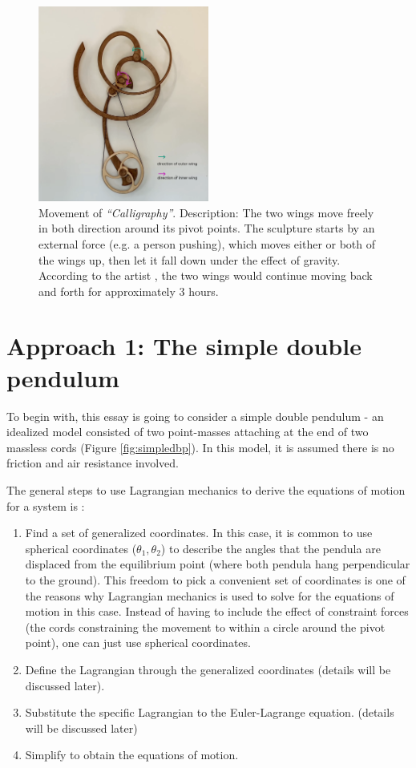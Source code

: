\documentclass[a4paper,12pt]{article}
\begin{document}
    \begin{figure}[H]
        \centering
        \includegraphics[width=0.5\textwidth]{movement} 
        \caption{Movement of \textit{“Calligraphy”}. Description: The two wings move freely in both direction around its pivot points. The sculpture starts by an external force (e.g. a person pushing), which moves either or both of the wings up, then let it fall down under the effect of gravity. According to the artist \cite{roy-2021}, the two wings would continue moving back and forth for approximately 3 hours.}
        \label{fig:movement}
    \end{figure}

\section{Approach 1: The simple double pendulum}
To begin with, this essay is going to consider a simple double pendulum - an idealized model consisted of two point-masses attaching at the end of two massless cords (Figure \ref{fig:simpledbp}). In this model, it is assumed there is no friction and air resistance involved.

The general steps to use Lagrangian mechanics to derive the equations of motion for a system is \cite{hirvonen-2022}:
\begin{enumerate}
    \item Find a set of generalized coordinates.
    In this case, it is common to use spherical coordinates ($\theta_1, \theta_2$) to describe the angles that the pendula are displaced from the equilibrium point (where both pendula hang perpendicular to the ground).
    This freedom to pick a convenient set of coordinates is one of the reasons why Lagrangian mechanics is used to solve for the equations of motion in this case. Instead of having to include the effect of constraint forces (the cords constraining the movement to within a circle around the pivot point), one can just use spherical coordinates.
    \pagebreak
    \item Define the Lagrangian through the generalized coordinates (details will be discussed later).
    \item  Substitute the specific Lagrangian to the Euler-Lagrange equation. (details will be discussed later)
    \item Simplify to obtain the equations of motion.
\end{enumerate}
\end{document}
